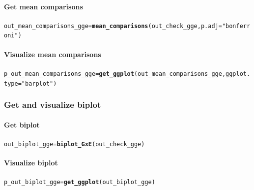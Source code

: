 \documentclass{book}\usepackage[]{graphicx}\usepackage[]{color}
\makeatletter
\newcommand{\hlstr}[1]{\textcolor[rgb]{0.192,0.494,0.8}{#1}}%
\newcommand{\hlstd}[1]{\textcolor[rgb]{0.345,0.345,0.345}{#1}}%
\newcommand{\hlkwb}[1]{\textcolor[rgb]{0.69,0.353,0.396}{#1}}%
\newcommand{\hlkwc}[1]{\textcolor[rgb]{0.333,0.667,0.333}{#1}}%
\newcommand{\hlkwd}[1]{\textcolor[rgb]{0.737,0.353,0.396}{\textbf{#1}}}%
\newenvironment{kframe}{%
 \def\at@end@of@kframe{}%
 \ifinner\ifhmode%
  \def\at@end@of@kframe{\end{minipage}}%
  \begin{minipage}{\columnwidth}%
 \fi\fi%
 \def\FrameCommand##1{\hskip\@totalleftmargin \hskip-\fboxsep
 \colorbox{shadecolor}{##1}\hskip-\fboxsep
     \hskip-\linewidth \hskip-\@totalleftmargin \hskip\columnwidth}%
 \MakeFramed {\advance\hsize-\width
   \@totalleftmargin\z@ \linewidth\hsize
   \@setminipage}}%
 {\par\unskip\endMakeFramed%
 \at@end@of@kframe}
\newenvironment{knitrout}{}{} %
\makeatother
\begin{document}
\paragraph{Get mean comparisons}
\begin{knitrout}
\color{fgcolor}\begin{kframe}
\begin{alltt}
\hlstd{out_mean_comparisons_gge} \hlkwb{=} \hlkwd{mean_comparisons}\hlstd{(out_check_gge,} \hlkwc{p.adj} \hlstd{=} \hlstr{"bonferroni"}\hlstd{)}
\end{alltt}
\end{kframe}
\end{knitrout}

\paragraph{Visualize mean comparisons}
\begin{knitrout}
\color{fgcolor}\begin{kframe}
\begin{alltt}
\hlstd{p_out_mean_comparisons_gge} \hlkwb{=} \hlkwd{get_ggplot}\hlstd{(out_mean_comparisons_gge,} \hlkwc{ggplot.type} \hlstd{=} \hlstr{"barplot"}\hlstd{)}
\end{alltt}
\end{kframe}
\end{knitrout}

\subsubsection{Get and visualize biplot}

\paragraph{Get biplot}
\begin{knitrout}
\color{fgcolor}\begin{kframe}
\begin{alltt}
\hlstd{out_biplot_gge} \hlkwb{=} \hlkwd{biplot_GxE}\hlstd{(out_check_gge)}
\end{alltt}
\end{kframe}
\end{knitrout}

\paragraph{Visualize biplot}
\begin{knitrout}
\color{fgcolor}\begin{kframe}
\begin{alltt}
\hlstd{p_out_biplot_gge} \hlkwb{=} \hlkwd{get_ggplot}\hlstd{(out_biplot_gge)}
\end{alltt}
\end{kframe}
\end{knitrout}
\end{document}
